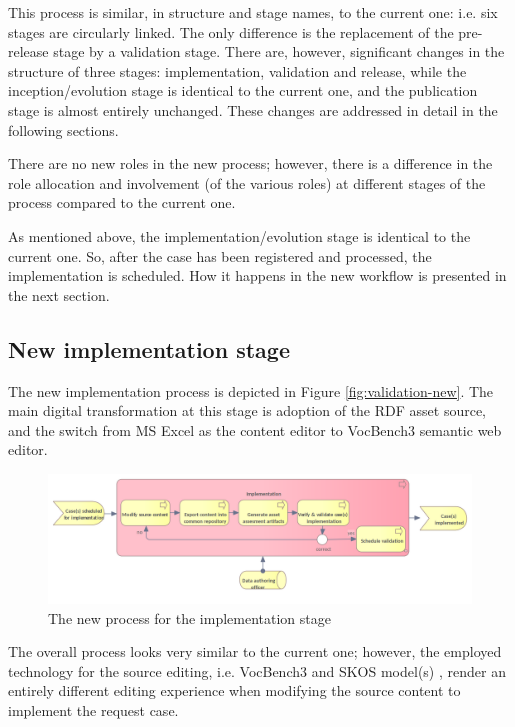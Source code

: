 	This process is similar, in structure and stage names, to the current one: i.e. six stages are circularly linked. The only difference is the replacement of the pre-release stage by a validation stage. There are, however, significant changes in the structure of three stages: implementation, validation and release, while the inception/evolution stage is identical to the current one, and the publication stage is almost entirely unchanged. These changes are addressed in detail in the following sections.
		
	There are no new roles in the new process; however, there is a difference in the role allocation and involvement (of the various roles) at different stages of the process compared to the current one. 
	
	As mentioned above, the implementation/evolution stage is identical to the current one. So, after the case has been registered and processed, the implementation is scheduled. How it happens in the new workflow is presented in the next section. 
			
	\subsection{New implementation stage}
	\label{sec:implementation-new}

	The new implementation process is depicted in Figure \ref{fig:validation-new}. The main digital transformation at this stage is adoption of the RDF asset source, and the switch from MS Excel as the content editor to VocBench3 \citep{stellato2017towards,stellatovocbench} semantic web editor. 
	
	\begin{figure}[h]
		\centering
		\includegraphics[width=1.05\textwidth]{images/business/new/Implementation.png}
		\caption{The new process for the implementation stage}
		\label{fig:implementation-new}
	\end{figure} 

	The overall process looks very similar to the current one; however, the employed technology for the source editing, i.e. VocBench3 \citep{stellatovocbench} and SKOS model(s) \citep{skos-spec}, render an entirely different editing experience when modifying the source content to implement the request case.
	
